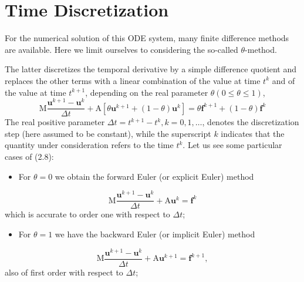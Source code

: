 \documentclass[11pt]{book}
\begin{document}
\section{Time Discretization}
For the numerical solution of this ODE system, many finite difference methods are available. Here we limit ourselves to considering the so-called $\theta$-method.

The latter discretizes the temporal derivative by a simple difference quotient and replaces the other terms with a linear combination of the value at time $t^{k}$ and of the value at time $t^{k+1}$, depending on the real parameter $\theta(0 \leq \theta \leq 1)$,
\begin{equation}
\mathrm{M} \frac{\mathbf{u}^{k+1}-\mathbf{u}^{k}}{\Delta t}+\mathrm{A}\left[\theta \mathbf{u}^{k+1}+(1-\theta) \mathbf{u}^{k}\right]=\theta \mathbf{f}^{k+1}+(1-\theta) \mathbf{f}^{k}
\end{equation}
The real positive parameter $\Delta t=t^{k+1}-t^{k}, k=0,1, \ldots$, denotes the discretization step (here assumed to be constant), while the superscript $k$ indicates that the quantity under consideration refers to the time $t^{k}$.
Let us see some particular cases of (2.8):
\begin{itemize}
  \item For $\theta=0$ we obtain the forward Euler (or explicit Euler) method
\end{itemize}
\begin{equation}
\mathrm{M} \frac{\mathbf{u}^{k+1}-\mathbf{u}^{k}}{\Delta t}+\mathrm{A} \mathbf{u}^{k}=\mathbf{f}^{k}
\end{equation}
which is accurate to order one with respect to $\Delta t$;

\begin{itemize}
  \item For $\theta=1$ we have the backward Euler (or implicit Euler) method
\end{itemize}
\begin{equation}
\mathrm{M} \frac{\mathbf{u}^{k+1}-\mathbf{u}^{k}}{\Delta t}+\mathrm{A} \mathbf{u}^{k+1}=\mathbf{f}^{k+1},
\end{equation}
also of first order with respect to $\Delta t$;
\end{document}

